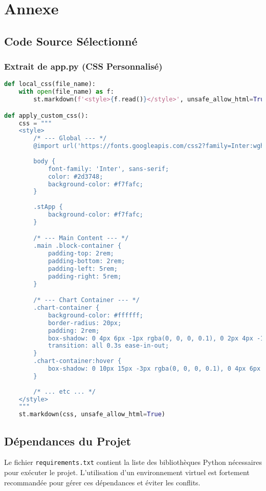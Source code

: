 \chapter{Annexe}

\section{Code Source Sélectionné}

\subsection{Extrait de app.py (CSS Personnalisé)}
\begin{lstlisting}[language=Python, caption={CSS pour le style du tableau de bord}]
def local_css(file_name):
    with open(file_name) as f:
        st.markdown(f'<style>{f.read()}</style>', unsafe_allow_html=True)

def apply_custom_css():
    css = """
    <style>
        /* --- Global --- */
        @import url('https://fonts.googleapis.com/css2?family=Inter:wght@400;600;700&display=swap');
        
        body {
            font-family: 'Inter', sans-serif;
            color: #2d3748;
            background-color: #f7fafc;
        }
        
        .stApp {
            background-color: #f7fafc;
        }

        /* --- Main Content --- */
        .main .block-container {
            padding-top: 2rem;
            padding-bottom: 2rem;
            padding-left: 5rem;
            padding-right: 5rem;
        }

        /* --- Chart Container --- */
        .chart-container {
            background-color: #ffffff;
            border-radius: 20px;
            padding: 2rem;
            box-shadow: 0 4px 6px -1px rgba(0, 0, 0, 0.1), 0 2px 4px -1px rgba(0, 0, 0, 0.06);
            transition: all 0.3s ease-in-out;
        }
        .chart-container:hover {
            box-shadow: 0 10px 15px -3px rgba(0, 0, 0, 0.1), 0 4px 6px -2px rgba(0, 0, 0, 0.05);
        }
        
        /* ... etc ... */
    </style>
    """
    st.markdown(css, unsafe_allow_html=True)
\end{lstlisting}

\section{Dépendances du Projet}
Le fichier \texttt{requirements.txt} contient la liste des bibliothèques Python nécessaires pour exécuter le projet. L'utilisation d'un environnement virtuel est fortement recommandée pour gérer ces dépendances et éviter les conflits.

